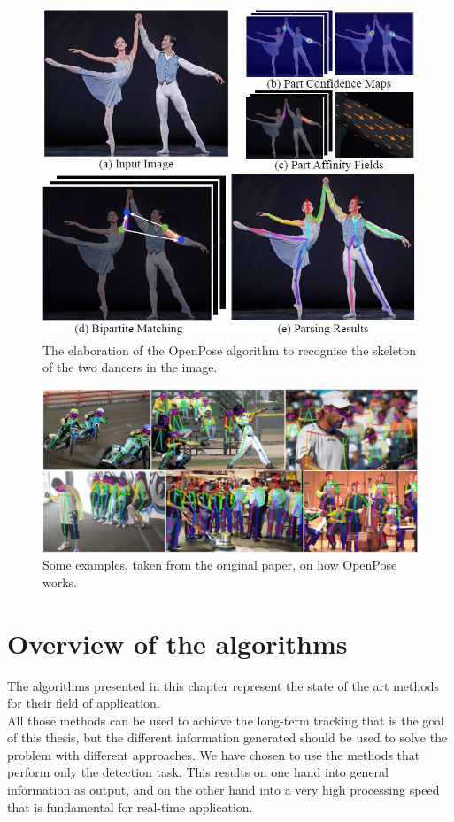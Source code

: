 \begin{figure}[!h]
	\centering
	\includegraphics[width=0.8\linewidth]{images/detection/howItWorks_openpose_2line}
	\captionsetup{margin=0.5cm}
	\caption[The steps of the OpenPose algorithm.]{The elaboration of the OpenPose algorithm to recognise the skeleton of the two dancers in the image.}
	\label{fig:howItWorks_openpose}
\end{figure}
\begin{figure}[!h]
	\centering
	\includegraphics[width=1\linewidth]{images/detection/ex_openpose_2line}
	\captionsetup{margin=0.5cm}
	\caption[Examples of application of OpenPose.]{Some examples, taken from the original paper, on how OpenPose works.}
	\label{fig:ex_openpose}
\end{figure}



\section{Overview of the algorithms}
The algorithms presented in this chapter represent the state of the art methods for their field of application.\\
All those methods can be used to achieve the long-term tracking that is the goal of this thesis, but the different information generated should be used to solve the problem with different approaches. We have chosen to use the methods that perform only the detection task. This results on one hand into general information as output, and on the other hand into a very high processing speed that is fundamental for real-time application.

